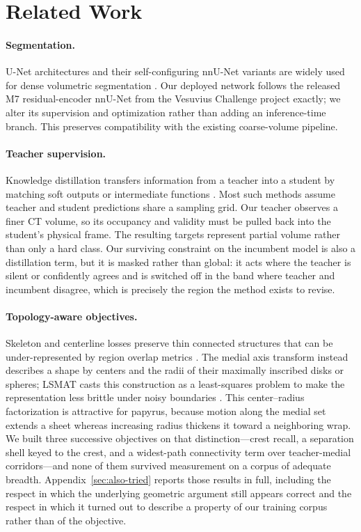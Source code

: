 \section{Related Work}
\label{sec:related}

\paragraph{Segmentation.}
U-Net architectures and their self-configuring nnU-Net variants are widely used for dense volumetric segmentation
\cite{ronneberger2015unet,isensee2021nnunet}. Our deployed network follows the released M7 residual-encoder nnU-Net from the
Vesuvius Challenge project exactly; we alter its supervision and optimization rather than adding an inference-time branch.
This preserves compatibility with the existing coarse-volume pipeline.

\paragraph{Teacher supervision.}
Knowledge distillation transfers information from a teacher into a student by matching soft outputs or intermediate functions \cite{hinton2015distilling}.
Most such methods assume teacher and student predictions share a sampling grid. Our teacher observes a finer CT volume, so its occupancy and validity must be
pulled back into the student's physical frame. The resulting targets represent partial volume rather than only a hard class.
Our surviving constraint on the incumbent model is also a distillation term, but
it is masked rather than global: it acts where the teacher is silent or
confidently agrees and is switched off in the band where teacher and incumbent
disagree, which is precisely the region the method exists to revise.

\paragraph{Topology-aware objectives.}
Skeleton and centerline losses preserve thin connected structures that can be
under-represented by region overlap metrics \cite{shit2021cldice}. The medial
axis transform instead describes a shape by centers and the radii of their
maximally inscribed disks or spheres; LSMAT casts this construction as a
least-squares problem to make the representation less brittle under noisy
boundaries \cite{rebain2019lsmat}. This center--radius factorization is
attractive for papyrus, because motion along the medial set extends a sheet
whereas increasing radius thickens it toward a neighboring wrap.
We built three successive objectives on that distinction---crest recall, a
separation shell keyed to the crest, and a widest-path connectivity term over
teacher-medial corridors---and none of them survived measurement on a corpus of
adequate breadth. Appendix~\ref{sec:also-tried} reports those results in full,
including the respect in which the underlying geometric argument still appears
correct and the respect in which it turned out to describe a property of our
training corpus rather than of the objective.

